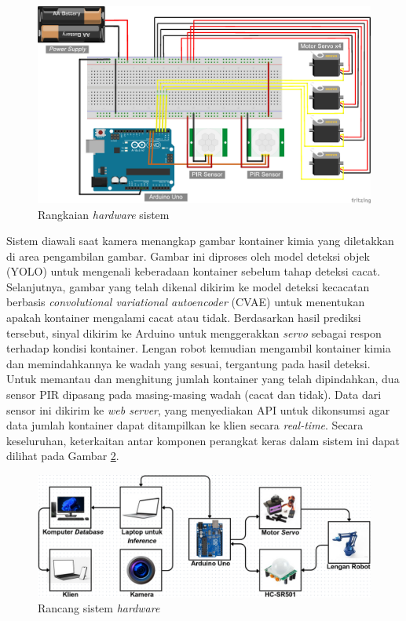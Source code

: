 \begin{figure}[H]
  \centering
  \includegraphics[width=\textwidth]{gambar/rangkaian.jpg}
  \caption{Rangkaian \textit{hardware} sistem}
  \label{fig:rangkaian}
\end{figure}
\vspace{-1em}

Sistem diawali saat kamera menangkap gambar kontainer kimia yang
diletakkan di area pengambilan gambar. Gambar ini diproses oleh model
deteksi objek (YOLO) untuk mengenali keberadaan kontainer sebelum
tahap deteksi cacat. Selanjutnya, gambar yang telah dikenal dikirim
ke model deteksi kecacatan berbasis \textit{convolutional variational
autoencoder} (CVAE) untuk
menentukan apakah kontainer mengalami cacat atau tidak. Berdasarkan
hasil prediksi tersebut, sinyal dikirim ke Arduino
untuk menggerakkan \textit{servo} sebagai respon terhadap kondisi
kontainer. Lengan robot kemudian mengambil kontainer kimia dan memindahkannya ke
wadah yang sesuai, tergantung pada hasil deteksi. Untuk memantau dan
menghitung jumlah
kontainer yang telah dipindahkan, dua sensor PIR dipasang pada
masing-masing wadah (cacat dan tidak). Data dari sensor ini
dikirim ke \textit{web server}, yang menyediakan API untuk dikonsumsi
agar data jumlah kontainer dapat ditampilkan ke klien secara
\textit{real-time}. Secara keseluruhan, keterkaitan antar komponen
perangkat keras dalam sistem ini dapat dilihat pada Gambar \ref{fig:hardware}.

\begin{figure}[H]
  \centering
  \includegraphics[width=\textwidth]{gambar/rancang.png}
  \caption{Rancang sistem \textit{hardware}}
  \label{fig:hardware}
\end{figure}
\vspace{-1em}

